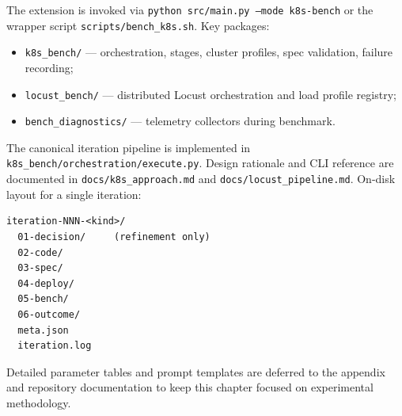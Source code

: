 The extension is invoked via \texttt{python src/main.py --mode k8s-bench} or the
wrapper script \texttt{scripts/bench\_k8s.sh}.  Key packages:
\begin{itemize}
  \item \texttt{k8s\_bench/} --- orchestration, stages, cluster profiles,
        spec validation, failure recording;
  \item \texttt{locust\_bench/} --- distributed Locust orchestration and load
        profile registry;
  \item \texttt{bench\_diagnostics/} --- telemetry collectors during benchmark.
\end{itemize}

The canonical iteration pipeline is implemented in
\texttt{k8s\_bench/orchestration/execute.py}.  Design rationale and CLI
reference are documented in \texttt{docs/k8s\_approach.md} and
\texttt{docs/locust\_pipeline.md}.  On-disk layout for a single iteration:

\begin{verbatim}
iteration-NNN-<kind>/
  01-decision/     (refinement only)
  02-code/
  03-spec/
  04-deploy/
  05-bench/
  06-outcome/
  meta.json
  iteration.log
\end{verbatim}

Detailed parameter tables and prompt templates are deferred to the appendix
and repository documentation to keep this chapter focused on experimental
methodology.
